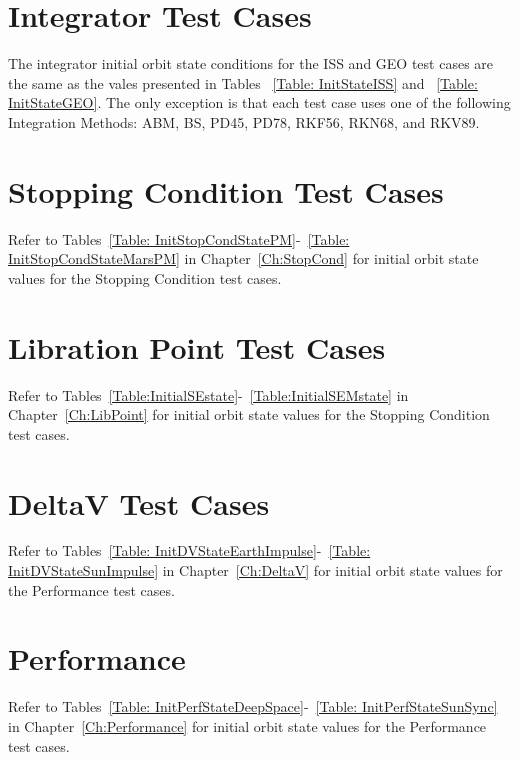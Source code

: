 \section{Integrator Test Cases}
The integrator initial orbit state conditions for the ISS
and GEO test cases are the same as the vales presented in
Tables ~\ref{Table: InitStateISS} and ~\ref{Table: InitStateGEO}.
The only exception is that each test case uses one of the following
Integration Methods: ABM, BS, PD45, PD78, RKF56, RKN68, and RKV89.

\section{Stopping Condition Test Cases}
Refer to Tables~\ref{Table: InitStopCondStatePM}-~\ref{Table:
InitStopCondStateMarsPM} in Chapter~\ref{Ch:StopCond} for initial
orbit state values for the Stopping Condition test cases.

\section{Libration Point Test Cases}
Refer to
Tables~\ref{Table:InitialSEstate}-~\ref{Table:InitialSEMstate} in
Chapter~\ref{Ch:LibPoint} for initial orbit state values for the
Stopping Condition test cases.

\section{DeltaV Test Cases}
Refer to Tables~\ref{Table: InitDVStateEarthImpulse}-~\ref{Table:
InitDVStateSunImpulse} in Chapter~\ref{Ch:DeltaV} for initial orbit
state values for the Performance test cases.

\section{Performance}
Refer to Tables~\ref{Table: InitPerfStateDeepSpace}-~\ref{Table:
InitPerfStateSunSync} in Chapter~\ref{Ch:Performance} for initial
orbit state values for the Performance test cases.
